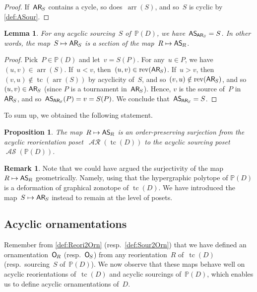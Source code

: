 \documentclass{amsart}
\newtheorem{proposition}[theorem]{Proposition}
\newtheorem{lemma}[theorem]{Lemma}
\theoremstyle{definition}
\newtheorem{remark}[theorem]{Remark}
\renewcommand{\c}[1]{\mathcal{#1}} %
\DeclareMathOperator{\tc}{tc} %
\newcommand{\mymap}[2]{\mathsf{#1}_{\hspace{-.7pt}#2}}
\newcommand{\orn}[1]{\mymap{O}{#1}}  %
\DeclareMathOperator{\AReori}{\c{AR}}  %
\newcommand{\areori}[1]{\mymap{AR}{#1}}  %
\DeclareMathOperator{\rev}{rev} %
\DeclareMathOperator{\ASour}{\mathcal{AS}}  %
\newcommand{\asour}[1]{\mymap{AS}{#1}}  %
\DeclareMathOperator{\arr}{arr} %
\newcommand{\PP}{\mathbb P} %
\begin{document}
\begin{proof}
If~$\areori{S}$ contains a cycle, so does~$\arr(S)$, and so~$S$ is cyclic by \cref{def:ASour}.
\end{proof}

\begin{lemma}
\label{lem:ASour2AReori2}
For any acyclic sourcing~$S$ of~$\PP(D)$, we have~$\asour{\areori{S}} = S$. In other words, the map~$S \mapsto \areori{S}$ is a section of the map~$R \mapsto \asour{R}$.
\end{lemma}

\begin{proof}
Pick~$P \in \PP(D)$ and let~$v = S(P)$.
For any~$u \in P$, we have~$(u,v) \in \arr(S)$.
If~$u < v$, then~$(u,v) \in \rev(\areori{S})$.
If~$u > v$, then~$(v,u) \notin \tc(\arr(S))$ by acyclicity of~$S$, and so~$(v,u) \notin \rev(\areori{S})$, and so~$(u,v) \in \areori{S}$ (since $P$ is a tournament in~$\areori{S}$).
Hence, $v$ is the source of~$P$ in~$\areori{S}$, and so~$\asour{\areori{S}}(P) = v = S(P)$.
We conclude that~$\asour{\areori{S}} = S$. 
\end{proof}

To sum up, we obtained the following statement.

\begin{proposition}
\label{prop:AReori2ASour}
The map~$R \mapsto \asour{R}$ is an order-preserving surjection from the acyclic reorientation poset~$\AReori(\tc(D))$ to the acyclic sourcing poset~$\ASour(\PP(D))$.
\end{proposition}

\begin{remark}
Note that we could have argued the surjectivity of the map~$R \mapsto \asour{R}$ geometrically.
Namely, using that the hypergraphic polytope of $\PP(D)$ is a deformation of graphical zonotope of $\tc(D)$.
We have introduced the map~$S \mapsto \areori{S}$ instead to remain at the level of posets.
\end{remark}


\subsection{Acyclic ornamentations}
\label{subsec:acyclicOrnamentations}

Remember from \cref{def:Reori2Orn} (resp.~\cref{def:Sour2Orn}) that we have defined an ornamentation~$\orn{R}$ (resp.~$\orn{S}$) from any reorientation~$R$ of~$\tc(D)$ (resp.~sourcing~$S$ of~$\PP(D)$).
We now observe that these maps behave well on acyclic reorientations of~$\tc(D)$ and acyclic sourcings of~$\PP(D)$, which enables us to define acyclic ornamentations of~$D$.
\end{document}
